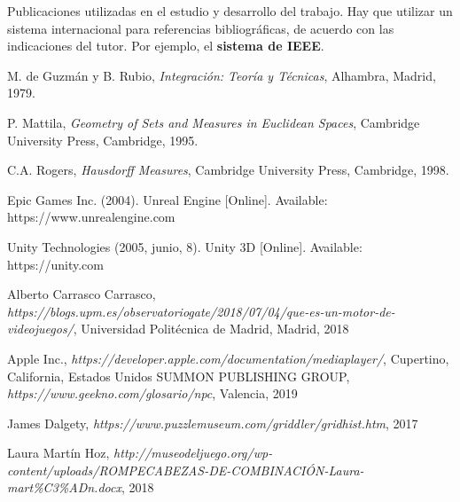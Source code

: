 \begin{thebibliography}{99}
 Publicaciones utilizadas en el estudio y desarrollo del trabajo.
Hay que utilizar un sistema internacional para referencias bibliográficas, de acuerdo con las indicaciones del tutor. Por ejemplo, el \textbf{sistema de IEEE}.

 M. de Guzmán y B. Rubio, \textit{Integración: Teoría y Técnicas}, Alhambra, Madrid, 1979.

 P. Mattila, \textit{Geometry of Sets and Measures in Euclidean Spaces}, Cambridge University Press, Cambridge, 1995.

 C.A. Rogers, \textit{Hausdorff Measures}, Cambridge University Press, Cambridge, 1998.

 Epic Games Inc. (2004). Unreal Engine [Online]. Available: https://www.unrealengine.com

 Unity Technologies (2005, junio, 8). Unity 3D [Online]. Available: https://unity.com

 Alberto Carrasco Carrasco, \textit{https://blogs.upm.es/observatoriogate/2018/07/04/que-es-un-motor-de-videojuegos/}, Universidad Politécnica de Madrid, Madrid, 2018

 Apple Inc., \textit{https://developer.apple.com/documentation/mediaplayer/}, Cupertino, California, Estados Unidos
 SUMMON PUBLISHING GROUP, \textit{https://www.geekno.com/glosario/npc}, Valencia, 2019

 James Dalgety, \textit{https://www.puzzlemuseum.com/griddler/gridhist.htm}, 2017

 Laura Martín Hoz, \textit{http://museodeljuego.org/wp-content/uploads/ROMPECABEZAS-DE-COMBINACIÓN-Laura-mart\%C3\%ADn.docx}, 2018

\end{thebibliography}

